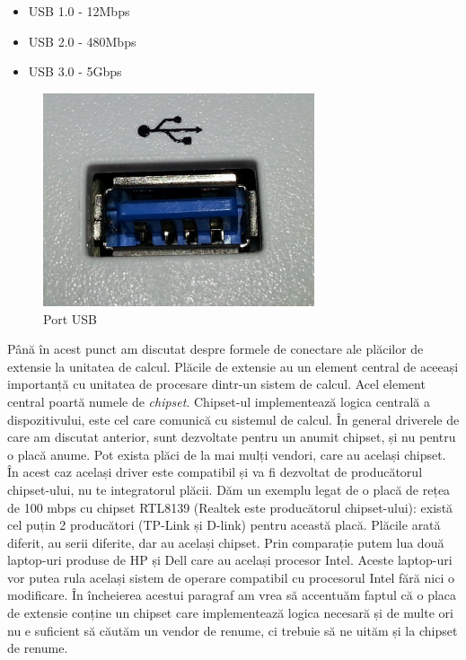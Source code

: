 \begin{itemize}
	\item USB 1.0 - 12Mbps
	\item USB 2.0 - 480Mbps
	\item USB 3.0 - 5Gbps
\end{itemize}

\begin{figure}[!htbp]
	\centering
	\includegraphics[width=8cm]{chapters/08-hw/img/usb-img.png}
	\caption{Port USB\protect\footnotemark}
	\label{fig:hw-usb}
\end{figure}


Până în acest punct am discutat despre formele de conectare ale plăcilor de
extensie la unitatea de calcul. Plăcile de extensie au un element central de
aceeași importanță cu unitatea de procesare dintr-un sistem de calcul. Acel
element central poartă numele de \textit{chipset}. Chipset-ul implementează logica
centrală a dispozitivului, este cel care comunică cu sistemul de calcul. În
general driverele de care am discutat anterior, sunt dezvoltate pentru un anumit
chipset, și nu pentru o placă anume. Pot exista plăci de la mai mulți vendori,
care au același chipset. În acest caz același driver este compatibil și va fi
dezvoltat de producătorul chipset-ului, nu te integratorul plăcii. Dăm un
exemplu legat de o placă de rețea de 100 mbps cu chipset RTL8139 (Realtek este
producătorul chipset-ului): există cel puțin 2 producători (TP-Link și D-link)
pentru această placă. Plăcile arată diferit, au serii diferite, dar au același
chipset. Prin comparație putem lua două laptop-uri produse de HP și Dell care au
același procesor Intel. Aceste laptop-uri vor putea rula același sistem de
operare compatibil cu procesorul Intel fără nici o modificare. În încheierea
acestui paragraf am vrea să accentuăm faptul că o placa de extensie conține un
chipset care implementează logica necesară și de multe ori nu e suficient să
căutăm un vendor de renume, ci trebuie să ne uităm și la chipset de renume.

